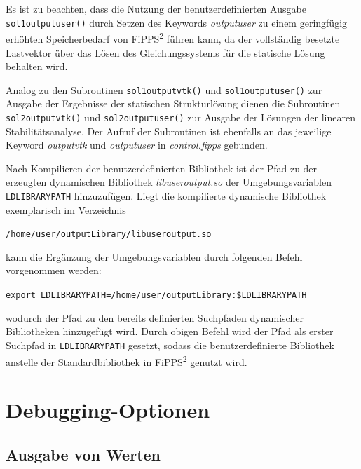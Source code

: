 \documentclass[11pt,titlepage,listof=totoc,bibliography=totoc,twoside]{scrreprt}
\begin{document}
{{Es ist zu beachten, dass die Nutzung der benutzerdefinierten Ausgabe \texttt{sol1\textunderscore output\textunderscore user()} durch Setzen des Keywords \emph{outputuser} zu einem geringfügig erhöhten Speicherbedarf von FiPPS\textsuperscript{2} führen kann, da der vollständig besetzte Lastvektor über das Lösen des Gleichungssystems für die statische Lösung behalten wird.

Analog zu den Subroutinen \texttt{sol1\textunderscore output\textunderscore vtk()}  und \texttt{sol1\textunderscore output\textunderscore user()} zur Ausgabe der Ergebnisse der statischen Strukturlösung dienen die Subroutinen \texttt{sol2\textunderscore output\textunderscore vtk()} und \texttt{sol2\textunderscore output\textunderscore user()} zur Ausgabe der Lösungen der linearen Stabilitätsanalyse. Der Aufruf der Subroutinen ist ebenfalls an das jeweilige Keyword \emph{outputvtk} und \emph{outputuser} in \emph{control.fipps} gebunden.

Nach Kompilieren der benutzerdefinierten Bibliothek ist der Pfad zu der erzeugten dynamischen Bibliothek \emph{libuseroutput.so} der Umgebungsvariablen \texttt{LD\textunderscore LIBRARY\textunderscore PATH} hinzuzufügen. Liegt die kompilierte dynamische Bibliothek exemplarisch im Verzeichnis

\begin{center}
\texttt{/home/user/outputLibrary/libuseroutput.so}
\end{center}

kann die Ergänzung der Umgebungsvariablen durch folgenden Befehl vorgenommen werden:

\begin{center}
\texttt{export LD\textunderscore LIBRARY\textunderscore PATH=/home/user/outputLibrary:\$LD\textunderscore LIBRARY\textunderscore PATH}
\end{center}

wodurch der Pfad zu den bereits definierten Suchpfaden dynamischer Bibliotheken hinzugefügt wird. Durch obigen Befehl wird der Pfad als erster Suchpfad in \texttt{LD\textunderscore LIBRARY\textunderscore PATH} gesetzt, sodass die benutzerdefinierte Bibliothek anstelle der Standardbibliothek in FiPPS\textsuperscript{2} genutzt wird.

\newpage

\chapter{Debugging-Optionen}

\section{Ausgabe von Werten}

}}
\end{document}
